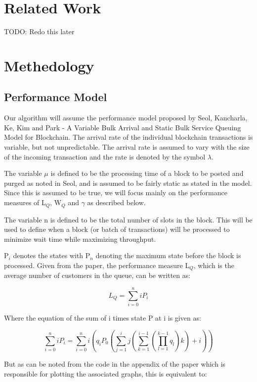 \documentclass[conference]{IEEEtran}
\begin{document}
\section{Related Work}\label{related}

TODO: Redo this later

\section{Methedology}
\subsection{Performance Model}\label{Model}
Our algorithm will assume the performance model proposed by Seol, Kancharla, Ke, Kim and Park
 - A Variable Bulk Arrival and Static Bulk Service Queuing Model for Blockchain\cite{2020_ACM_Seol}. 
 The arrival rate of the individual blockchain transactions is variable, but not unpredictable. 
 The arrival rate is assumed to vary with the size of the incoming transaction and the rate is 
 denoted by the symbol $\lambda$.

The variable $\mu$ is defined to be the processing time of a block to be posted and purged as noted 
in Seol\cite{2020_ACM_Seol}, and is assumed to be fairly static as stated in the model. Since this is 
assumed to be true, we will focus mainly on the performance measures of L$_Q$, W$_Q$ and $\gamma$ 
as described below.

The variable n is defined to be the total number of slots in the block. This will be used to 
define when a block (or batch of transactions) will be processed to minimize wait time while 
maximizing throughput. 

P$_i$ denotes the states with P$_n$ denoting the maximum state before the block is processed. Given 
from the paper, the performance measure L$_Q$, which is the average number of customers in the 
queue, can be written as:

\begin{equation}
L_Q=\sum_{i=0}^niP_i\label{LQ_eq}
\end{equation}

Where the equation of the sum of i times state P at i is given as:

\begin{equation}
\sum_{i=0}^niP_i=\sum_{i=0}^ni(q_iP_0(\sum_{j=1}^ij(\sum_{k=1}^{i-1}(\prod_{l=1}^{k-1}q_l)k)+i))\label{sumiPi_eq}
\end{equation}

But as can be noted from the code in the appendix of the paper which is responsible for plotting 
the associated graphs, this is equivalent to: 
\end{document}
